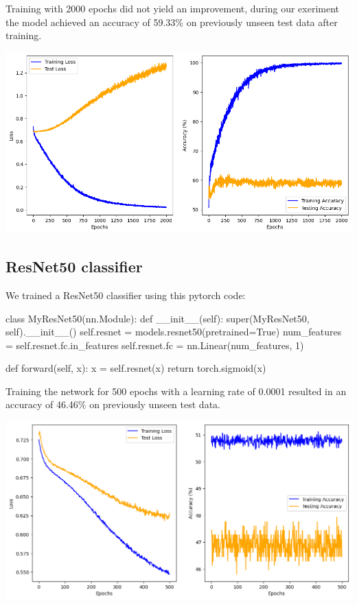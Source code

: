 Training with 2000 epochs did not yield an improvement, during our exeriment the
model achieved an accuracy of 59.33\% on previously unseen test data after
training.

\includegraphics*[width=\textwidth]
{Figures/EnhancedCNNWithDropout0.5_2000Epochs.png}



\subsection*{ResNet50 classifier}
We trained a ResNet50 classifier using this pytorch code:

\begin{python}
    class MyResNet50(nn.Module):
    def __init__(self):
        super(MyResNet50, self).__init__()
        self.resnet = models.resnet50(pretrained=True)
        num_features = self.resnet.fc.in_features
        self.resnet.fc = nn.Linear(num_features, 1)

    def forward(self, x):
        x = self.resnet(x)
        return torch.sigmoid(x)
\end{python}

Training the network for 500 epochs with a learning rate of 0.0001 resulted in
an accuracy of 46.46\% on previously unseen test data.

\includegraphics*[width=\textwidth]{Figures/ResNet50_classifier_0001.png}

